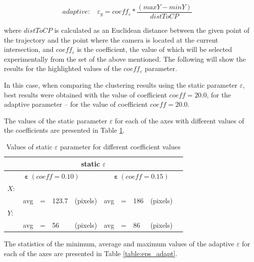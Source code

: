 \begin{equation} \label{eq:epsY-adapt}
	adaptive:\ \ \ \ \varepsilon_y = coeff_\varepsilon * \frac{(maxY - minY)}{distToCP}
\end{equation}

where $distToCP$ is calculated as an Euclidean distance between the given point of the trajectory and the point where the camera is located at the current intersection, and $coeff_\varepsilon$ is the coefficient, the value of which will be selected experimentally from the set of the above mentioned. The following will show the results for the highlighted values of the $coeff_\varepsilon$ parameter.

In this case, when comparing the clustering results using the static parameter $\varepsilon$, best results were obtained with the value of coefficient $coeff = 20.0$, for the adaptive parameter -- for the value of coefficient $coeff = 20.0$.

The values of the static parameter $\varepsilon$ for each of the axes with different values of the coefficients are presented in Table \ref{table:eps_st}.

\begin{table}[htb!]
	\caption{Values of static $\varepsilon$ parameter for different coefficient values}
	\label{table:eps_st}
	
	\setlength{\tabcolsep}{10pt}
	\centering
	
	\begin{tabular}
		{||lllll|lllll||}
		\multicolumn{10}{c}{static $\varepsilon$} \\[0.5ex]
		\hline
		\multicolumn{5}{||c}{$\bm{\varepsilon}\ (coeff = 0.10)$} & \multicolumn{5}{c||}{$\bm{\varepsilon}\ (coeff = 0.15)$} \\[0.5ex]
		$X:$       			& & & & & & & & & \\[0.5ex]
		& avg 	& = 	& 123.7 	& (pixels) & avg 	& = 	& 186 	& (pixels) &\\[0.5ex]
		$Y:$       			& & & & & & & & & \\[0.5ex]
		& avg 	& = 	& 56	 	& (pixels) & avg 	& = 	& 86 	& (pixels) &\\[0.5ex]
		\hline
	\end{tabular}
\end{table}

The statistics of the minimum, average and maximum values of the adaptive $\varepsilon$ for each of the axes are presented in Table \ref{table:eps_adapt}.

